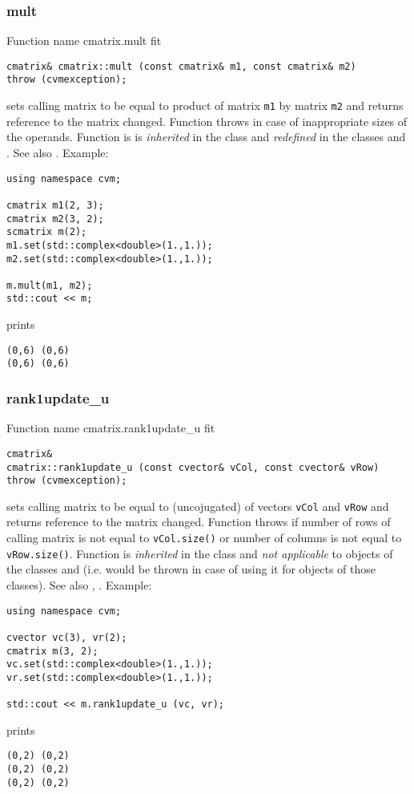 \subsubsection{mult}
Function%
\pdfdest name {cmatrix.mult} fit
\begin{verbatim}
cmatrix& cmatrix::mult (const cmatrix& m1, const cmatrix& m2)
throw (cvmexception);
\end{verbatim}
sets  calling matrix to be equal to  product of  matrix
\verb"m1" by  matrix \verb"m2"
and returns  reference to
the matrix changed.
Function throws  
in case of inappropriate sizes of the operands.
Function is is \emph{inherited} in the class 
and \emph{redefined} in the classes
and .
See also
.
Example:
\begin{Verbatim}
using namespace cvm;

cmatrix m1(2, 3);
cmatrix m2(3, 2);
scmatrix m(2);
m1.set(std::complex<double>(1.,1.));
m2.set(std::complex<double>(1.,1.));

m.mult(m1, m2);
std::cout << m;
\end{Verbatim}
prints
\begin{Verbatim}
(0,6) (0,6)
(0,6) (0,6)
\end{Verbatim}
\newpage



\subsubsection{rank1update\_u}
Function%
\pdfdest name {cmatrix.rank1update_u} fit
\begin{verbatim}
cmatrix&
cmatrix::rank1update_u (const cvector& vCol, const cvector& vRow)
throw (cvmexception);
\end{verbatim}
sets calling matrix to be equal to 
 (uncojugated) of vectors
\verb"vCol" and \verb"vRow"
and returns  reference to
the matrix changed.
Function throws  
if number of rows of  calling matrix
is not equal to \verb"vCol.size()"
or number of columns is not equal to \verb"vRow.size()".
Function is \emph{inherited} in the class
 and
\emph{not applicable} to objects of the classes
 and
 (i.e. 
 would be thrown
in case of using it for objects of those classes).
See also ,
.
Example:
\begin{Verbatim}
using namespace cvm;

cvector vc(3), vr(2);
cmatrix m(3, 2);
vc.set(std::complex<double>(1.,1.));
vr.set(std::complex<double>(1.,1.));

std::cout << m.rank1update_u (vc, vr);
\end{Verbatim}
prints
\begin{Verbatim}
(0,2) (0,2)
(0,2) (0,2)
(0,2) (0,2)
\end{Verbatim}
\newpage



